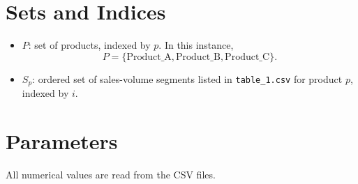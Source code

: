 \section*{Sets and Indices}

\begin{itemize}
    \item $P$: set of products, indexed by $p$. In this instance,
    \[
    P=\{\text{Product\_A},\text{Product\_B},\text{Product\_C}\}.
    \]
    \item $S_p$: ordered set of sales-volume segments listed in \texttt{table\_1.csv} for product $p$, indexed by $i$.
\end{itemize}

\section*{Parameters}

All numerical values are read from the CSV files.

